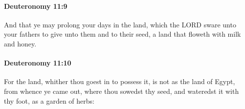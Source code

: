 		\paragraph{Deuteronomy 11:9} %
			\label{DEUTERONOMY-11-9}

			And that ye may prolong your days in the land, which the LORD sware unto your fathers to give unto them and to their seed, a land that floweth with milk and honey.


		\paragraph{Deuteronomy 11:10} %
			\label{DEUTERONOMY-11-10}

			For the land, whither thou goest in to possess it, is not as the land of Egypt, from whence ye came out, where thou sowedst thy seed, and wateredst it with thy foot, as a garden of herbs:

